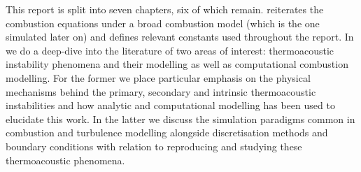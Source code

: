 This report is split into seven chapters, six of which remain.  reiterates the combustion equations under a broad combustion model (which is the one simulated later on) and defines relevant constants used throughout the report. In  we do a deep-dive into the literature of two areas of interest: thermoacoustic instability phenomena and their modelling as well as computational combustion modelling. For the former we place particular emphasis on the physical mechanisms behind the primary, secondary and intrinsic thermoacoustic instabilities and how analytic and computational modelling has been used to elucidate this work. In the latter we discuss the simulation paradigms common in combustion and turbulence modelling alongside discretisation methods and boundary conditions with relation to reproducing and studying these thermoacoustic phenomena.






